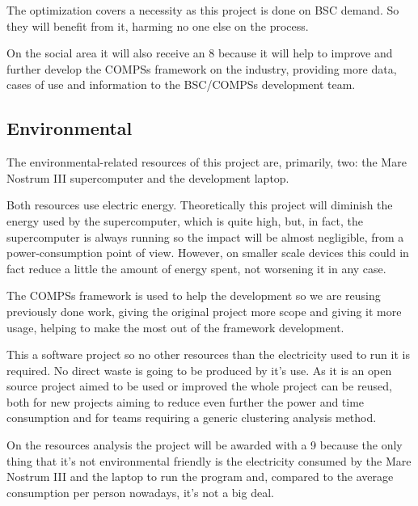 The optimization covers a necessity as this project is done on BSC demand. So they will benefit from it, harming no one else on the process.

On the social area it will also receive an 8 because it will help to improve and further develop the COMPSs framework on the industry, providing more data, cases of use and information to the BSC/COMPSs development team.

\subsection{Environmental}

The environmental-related resources of this project are, primarily, two: the Mare Nostrum III supercomputer and the development laptop.

Both resources use electric energy. Theoretically this project will diminish the energy used by the supercomputer, which is quite high, but, in fact, the supercomputer is always running so the impact will be almost negligible, from a power-consumption point of view. However, on smaller scale devices this could in fact reduce a little the amount of energy spent, not worsening it in any case.

The COMPSs framework is used to help the development so we are reusing previously done work, giving the original project more scope and giving it more usage, helping to make the most out of the framework development.

This a software project so no other resources than the electricity used to run it is required. No direct waste is going to be produced by it's use. As it is an open source project aimed to be used or improved the whole project can be reused, both for new projects aiming to reduce even further the power and time consumption and for teams requiring a generic clustering analysis method.

On the resources analysis the project will be awarded with a 9 because the only thing that it's not environmental friendly is the electricity consumed by the Mare Nostrum III and the laptop to run the program and, compared to the average consumption per person nowadays, it's not a big deal.